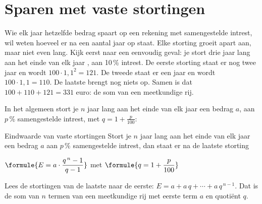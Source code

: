 \begin{oefeningen}
\end{oefeningen}

\section{Sparen met vaste stortingen}

Wie elk jaar hetzelfde bedrag spaart op een rekening met samengestelde intrest, wil weten hoeveel er na een aantal jaar op staat. Elke storting groeit apart aan, maar niet even lang. Kijk eerst naar een eenvoudig geval: je stort drie jaar lang aan het einde van elk jaar , aan 10\,\% intrest. De eerste storting staat er nog twee jaar en wordt $100 \cdot 1{,}1^2 = 121$. De tweede staat er een jaar en wordt $100 \cdot 1{,}1 = 110$. De laatste brengt nog niets op. Samen is dat $100 + 110 + 121 = 331$ euro: de som van een meetkundige rij.

In het algemeen stort je $n$ jaar lang aan het einde van elk jaar een bedrag $a$, aan $p\,\%$ samengestelde intrest, met $q = 1 + \tfrac{p}{100}$:

\vspace{2mm}

\begin{theorie}
\begin{stelling}{Eindwaarde van vaste stortingen}
Stort je $n$ jaar lang aan het einde van elk jaar een bedrag $a$ aan $p\,\%$ samengestelde intrest, dan staat er na de laatste storting

\vspace{1mm}
\qquad $\formule{E = a \cdot \dfrac{q^{\,n} - 1}{q - 1}}$ \quad met $\formule{q = 1 + \dfrac{p}{100}}$
\end{stelling}

\begin{bewijs}
Lees de stortingen van de laatste naar de eerste: $E = a + a\,q + \cdots + a\,q^{\,n-1}$. Dat is de som van $n$ termen van een meetkundige rij met eerste term $a$ en quotiënt $q$.
\end{bewijs}
\end{theorie}

